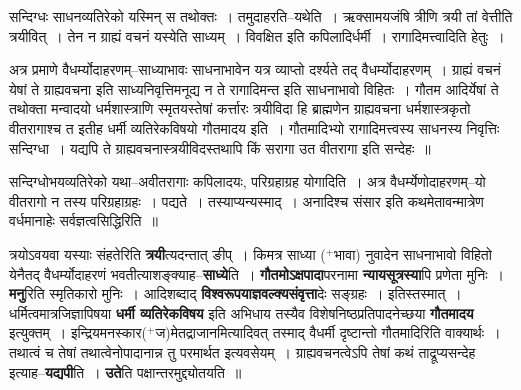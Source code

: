 \documentclass[article,12pt,a4paper]{memoir}
\newcommand{\add}[1]{($^{+}$#1)}
\begin{document}
	सन्दिग्धः साधनव्यतिरेको यस्मिन् स तथोक्तः । तमुदाहरति--यथेति । ऋक्सामयजंषि त्रीणि त्रयी तां वेत्तीति त्रयीवित् । तेन न ग्राह्यं वचनं यस्येति साध्यम् । विवक्षित इति कपिलादिर्धर्मी । रागादिमत्त्वादिति हेतुः ।  
	  
	अत्र प्रमाणे वैधर्म्योदाहरणम्--साध्याभावः साधनाभावेन यत्र व्याप्तो दर्श्यते तद् वैधर्म्योदाहरणम् । ग्राह्यं वचनं येषां ते ग्राह्यवचना इति साध्यनिवृत्तिमनूद्य न ते रागादिमन्त इति साधनाभावो विहितः । गौतम आदिर्येषां ते तथोक्ता मन्वादयो धर्मशास्त्राणि स्मृतयस्तेषां कर्त्तारः त्रयीविदा हि ब्राह्मणेन ग्राह्यवचना धर्मशास्त्रकृतो वीतरागाश्च त इतीह धर्मी व्यतिरेकविषयो गौतमादय इति । गौतमादिभ्यो रागादिमत्त्वस्य साधनस्य निवृत्तिः सन्दिग्धा । यद्यपि ते ग्राह्यवचनास्त्रयीविदस्तथापि किं सरागा उत वीतरागा इति सन्देहः ॥  
	  
	सन्दिग्धोभयव्यतिरेको यथा--अवीतरागाः कपिलादयः, परिग्रहाग्रह योगादिति । अत्र वैधर्म्येणोदाहरणम्--यो वीतरागो न तस्य परिग्रहाग्रहः ।    पद्यते । तस्याप्यन्यस्माद् । अनादिश्च संसार इति कथमेतावन्मात्रेण वर्धमानाहेः सर्वज्ञत्वसिद्धिरिति ॥
	\pend
      

	  \pstart त्रयोऽवयवा यस्याः संहतेरिति \textbf{त्रयी}त्यदन्तात् ङीप् । किमत्र साध्या \add{भावा} नुवादेन साधनाभावो विहितो येनैतद् वैधर्म्योदाहरणं भवतीत्याशङ्क्याह--\textbf{साध्ये}ति । \textbf{गौतमोऽक्षपादा}परनामा \textbf{न्यायसूत्रस्या}पि प्रणेता मुनिः । \textbf{मनु}रिति स्मृतिकारो मुनिः । आदिशब्दाद् \textbf{विश्वरूपयाज्ञवल्क्यसंवृत्ता}देः सङ्ग्रहः । इतिस्तस्मात् । धर्मित्वमात्रजिज्ञापिषया \textbf{धर्मी व्यतिरेकविषय} इति अभिधाय तस्यैव विशेषनिष्ठप्रतिपादनेच्छया \textbf{गौतमादय} इत्युक्तम् । इन्द्रियमनस्कार\add{ज}मेतद्राजानमित्यादिवत् तस्माद् वैधर्मी दृष्टान्तो गौतमादिरिति वाक्यार्थः । तथात्वं च तेषां तथात्वेनोपादानान्न तु परमार्थत इत्यवसेयम् । ग्राह्यवचनत्वेऽपि तेषां कथं ताद्रूप्यसन्देह इत्याह--\textbf{यद्यपी}ति । \textbf{उते}ति पक्षान्तरमुद्द्योतयति ॥
	\pend
	  \bigskip
	  \begingroup
	
\end{document}
